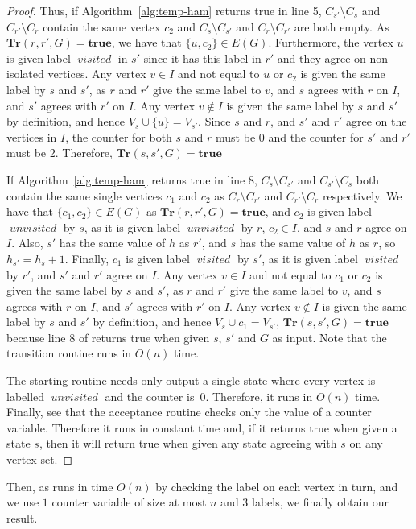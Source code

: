 \documentclass[a4paper,UKenglish,cleveref, autoref, thm-restate]{lipics-v2021} %
\DeclareMathOperator{\visited}{\textit{visited}}
\DeclareMathOperator{\unvisited}{\textit{unvisited}}
\begin{document}
\begin{toappendix}
\begin{proof}
    Thus, if Algorithm~\ref{alg:temp-ham} returns true in line 5, $C_{s'} \setminus C_s$ and $C_{r'} \setminus C_r$ contain the same vertex $c_2$ and $C_{s} \setminus C_{s'}$ and $C_{r} \setminus C_{r'}$ are both empty. As $\textbf{Tr}(r, r', G)=\textbf{true}$, we have that $\{u, c_2\} \in E(G)$. Furthermore, the vertex $u$ is given label $\visited$ in $s'$ since it has this label in $r'$ and they agree on non-isolated vertices. Any vertex $v \in I$ and not equal to $u$ or $c_2$ is given the same label by $s$ and $s'$, as $r$ and $r'$ give the same label to $v$, and $s$ agrees with $r$ on $I$, and $s'$ agrees with $r'$ on $I$. Any vertex $v \notin I$ is given the same label by $s$ and $s'$ by definition, and hence $V_s \cup \{u\} = V_{s'}$. Since $s$ and $r$, and $s'$ and $r'$ agree on the vertices in $I$, the counter for both $s$ and $r$ must be 0 and the counter for $s'$ and $r'$ must be 2. Therefore, $\textbf{Tr}(s, s', G)=\textbf{true}$
    
    If Algorithm~\ref{alg:temp-ham} returns true in line 8, $C_s \setminus C_{s'}$ and $C_{s'} \setminus C_s$ both contain the same single vertices $c_1$ and $c_2$ as $C_r \setminus C_{r'}$ and $C_{r'} \setminus C_r$ respectively. We have that $\{c_1, c_2\} \in E(G)$ as $\textbf{Tr}(r, r', G)=\textbf{true}$, and $c_2$ is given label $\unvisited$ by $s$, as it is given label $\unvisited$ by $r$, $c_2 \in I$, and $s$ and $r$ agree on $I$. Also, $s'$ has the same value of $h$ as $r'$, and $s$ has the same value of $h$ as $r$, so $h_{s'} = h_s + 1$. Finally, $c_1$ is given label $\visited$ by $s'$, as it is given label $\visited$ by $r'$, and $s'$ and $r'$ agree on $I$. Any vertex $v \in I$ and not equal to $c_1$ or $c_2$ is given the same label by $s$ and $s'$, as $r$ and $r'$ give the same label to $v$, and $s$ agrees with $r$ on $I$, and $s'$ agrees with $r'$ on $I$. Any vertex $v \notin I$ is given the same label by $s$ and $s'$ by definition, and hence $V_s \cup c_1 = V_{s'}$, $\textbf{Tr}(s, s', G)=\textbf{true}$ because line 8 of  returns true when given $s$, $s'$ and $G$ as input. Note that the transition routine runs in $O(n)$ time.

    The starting routine needs only output a single state where every vertex is labelled $\unvisited$ and the counter is~0. Therefore, it runs in $O(n)$ time. Finally, see that the acceptance routine checks only the value of a counter variable. Therefore it runs in constant time and, if it returns true when given a state $s$, then it will return true when given any state agreeing with $s$ on any vertex set.
\end{proof}
Then, as  runs in time $O(n)$ by checking the label on each vertex in turn, and we use $1$ counter variable of size at most $n$ and 3 labels, we finally obtain our result.


\end{toappendix}
\end{document}
